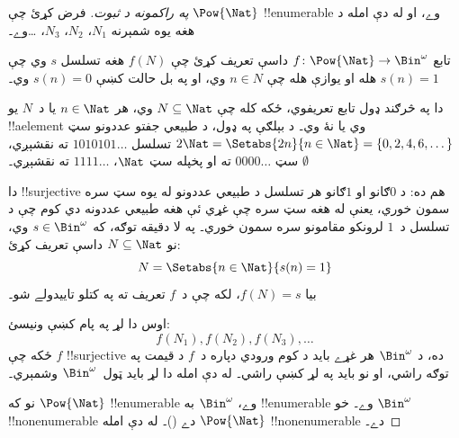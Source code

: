 \documentclass[../../../include/open-logic-section]{subfiles}
\begin{document}
\begin{proof}[په راکمونه د {} ثبوت]
فرض کړئ چې $\Pow{\Nat}$ !!{enumerable} وے، او له دې امله د هغه
يوه شمېرنه $N_{1}$، $N_{2}$، $N_{3}$، \dots وے۔

تابع $f \colon \Pow{\Nat} \to \Bin^\omega$ داسې تعريف کړئ چې
$f(N)$ هغه تسلسل $s$ وي چې $s(n) = 1$ هله او يوازې هله چې
$n \in N$ وي، او په بل حالت کښې $s(n) = 0$ وي۔

دا په څرګند ډول تابع تعريفوي، ځکه کله چې $N \subseteq \Nat$ وي،
هر $n \in \Nat$ يا د~$N$ يو !!a{element} وي يا نۀ وي۔ د بېلګې
په ډول، د طبيعي جفتو عددونو سټ
$2\Nat = \Setabs{2n}{n \in \Nat} = \{0,2, 4, 6, \dots\}$
تسلسل $1010101\dots$ ته نقشېږي، $\emptyset$ سټ $0000\dots$ ته او پخپله
سټ $\Nat$، $1111\dots$ ته نقشېږي۔

دا !!{surjective} هم ده: د $0$ګانو او $1$ګانو هر تسلسل د طبيعي
عددونو له يوه سټ سره سمون خوري، يعنې له هغه سټ سره چې غړي ئې
هغه طبيعي عددونه دي کوم چې د تسلسل د~$1$ لرونکو مقامونو سره
سمون خوري۔ په لا دقيقه توګه، که $s \in \Bin^\omega$ وي، نو
$N \subseteq \Nat$ داسې تعريف کړئ:
\[
N = \Setabs{n \in \Nat}{s(n) = 1}
\]
بيا $f(N) = s$، لکه چې د~$f$ تعريف ته په کتلو تاييدولے شو۔

اوس دا لړ په پام کښې ونيسئ:
\[
f(N_1), f(N_2), f(N_3), \dots
\]
ځکه چې $f$ !!{surjective} ده، د $\Bin^\omega$ هر غړے بايد د کوم
ورودي دپاره د~$f$ د قيمت په توګه راشي، او نو بايد په لړ کښې راشي۔
له دې امله دا لړ بايد ټول~$\Bin^\omega$ وشمېري۔

نو که $\Pow{\Nat}$ !!{enumerable} وے، $\Bin^\omega$ به
!!{enumerable} وے۔ خو $\Bin^\omega$ !!{nonenumerable} دے
()۔ له دې امله
$\Pow{\Nat}$ !!{nonenumerable} دے۔
\end{proof}

\end{document}
